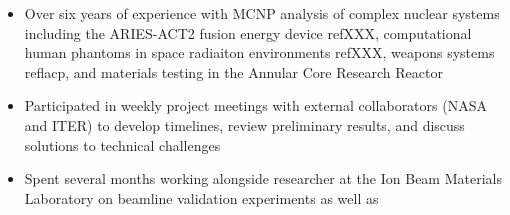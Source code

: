 \documentclass[a4paper,10pt]{article}
\begin{document}
\begin{itemize}[leftmargin=.9in,rightmargin=.875in,itemsep=1.6mm]

                \item Over six years of experience with MCNP analysis of complex nuclear
	              systems including the ARIES-ACT2 fusion energy device refXXX,
		      computational human phantoms in space radiaiton environments
		      refXXX, weapons systems reflacp, and materials testing in the
		      Annular Core Research Reactor
                \item Participated in weekly project meetings with external collaborators (NASA and
	              ITER) to develop timelines, review preliminary results, and discuss
		      solutions to technical challenges
		\item Spent several months working alongside researcher
			at the Ion Beam Materials Laboratory
			on beamline validation experiments as well as

\end{itemize}
\end{document}
